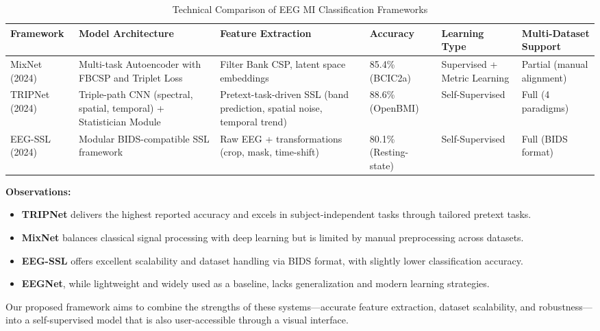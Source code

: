 \begin{table}[H]
    \centering
    \caption{Technical Comparison of EEG MI Classification Frameworks}
    \label{tab:competitor-comparison}
    \small
    \begin{tabularx}{\textwidth}{|p{2cm}|p{2.2cm}|p{2.2cm}|p{1.7cm}|p{2cm}|p{2cm}|}
        \hline
        \textbf{Framework} & \textbf{Model Architecture} & \textbf{Feature Extraction} & \textbf{Accuracy} & \textbf{Learning Type} & \textbf{Multi-Dataset Support} \\
        \hline
        MixNet (2024) & Multi-task Autoencoder with FBCSP and Triplet Loss & Filter Bank CSP, latent space embeddings & 85.4\% (BCIC2a) & Supervised + Metric Learning & Partial (manual alignment) \\
        \hline
        TRIPNet (2024) & Triple-path CNN (spectral, spatial, temporal) + Statistician Module & Pretext-task-driven SSL (band prediction, spatial noise, temporal trend) & 88.6\% (OpenBMI) & Self-Supervised & Full (4 paradigms) \\
        \hline
        EEG-SSL (2024) & Modular BIDS-compatible SSL framework & Raw EEG + transformations (crop, mask, time-shift) & 80.1\% (Resting-state) & Self-Supervised & Full (BIDS format) \\
        \hline
    \end{tabularx}
\end{table}
\noindent
\textbf{Observations:}
\begin{itemize}
    \item \textbf{TRIPNet} delivers the highest reported accuracy and excels in subject-independent tasks through tailored pretext tasks.
    \item \textbf{MixNet} balances classical signal processing with deep learning but is limited by manual preprocessing across datasets.
    \item \textbf{EEG-SSL} offers excellent scalability and dataset handling via BIDS format, with slightly lower classification accuracy.
    \item \textbf{EEGNet}, while lightweight and widely used as a baseline, lacks generalization and modern learning strategies.
\end{itemize}

\noindent
Our proposed framework aims to combine the strengths of these systems—accurate feature extraction, dataset scalability, and robustness—into a self-supervised model that is also user-accessible through a visual interface.

